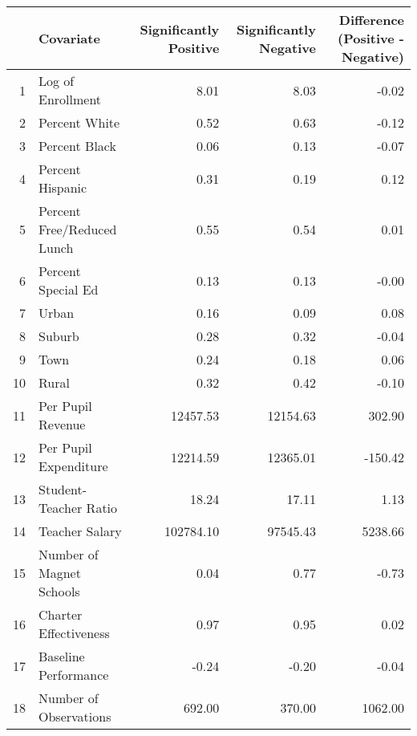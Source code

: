 \begin{tabular}{rlrrr}
  \hline
 & Covariate & Significantly Positive & Significantly Negative & Difference (Positive - Negative) \\ 
  \hline
1 & Log of Enrollment & 8.01 & 8.03 & -0.02 \\ 
  2 & Percent White & 0.52 & 0.63 & -0.12 \\ 
  3 & Percent Black & 0.06 & 0.13 & -0.07 \\ 
  4 & Percent Hispanic & 0.31 & 0.19 & 0.12 \\ 
  5 & Percent Free/Reduced Lunch & 0.55 & 0.54 & 0.01 \\ 
  6 & Percent Special Ed & 0.13 & 0.13 & -0.00 \\ 
  7 & Urban & 0.16 & 0.09 & 0.08 \\ 
  8 & Suburb & 0.28 & 0.32 & -0.04 \\ 
  9 & Town & 0.24 & 0.18 & 0.06 \\ 
  10 & Rural & 0.32 & 0.42 & -0.10 \\ 
  11 & Per Pupil Revenue & 12457.53 & 12154.63 & 302.90 \\ 
  12 & Per Pupil Expenditure & 12214.59 & 12365.01 & -150.42 \\ 
  13 & Student-Teacher Ratio & 18.24 & 17.11 & 1.13 \\ 
  14 & Teacher Salary & 102784.10 & 97545.43 & 5238.66 \\ 
  15 & Number of Magnet Schools & 0.04 & 0.77 & -0.73 \\ 
  16 & Charter Effectiveness & 0.97 & 0.95 & 0.02 \\ 
  17 & Baseline Performance & -0.24 & -0.20 & -0.04 \\ 
  18 & Number of Observations & 692.00 & 370.00 & 1062.00 \\ 
   \hline
\end{tabular}
